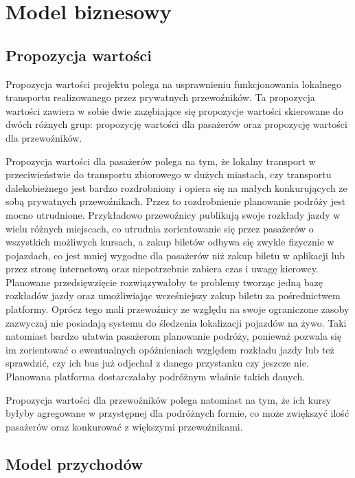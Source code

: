 \chapter{Model biznesowy}
\label{chap:drugi}



\section{Propozycja wartości}

Propozycja wartości projektu polega na usprawnieniu funkcjonowania lokalnego transportu realizowanego przez prywatnych przewoźników. Ta propozycja wartości zawiera w sobie dwie zazębiające się propozycje wartości skierowane do dwóch różnych grup: propozycję wartości dla pasażerów oraz propozycję wartości dla przewoźników.

Propozycja wartości dla pasażerów polega na tym, że lokalny transport w przeciwieństwie do transportu zbiorowego w dużych miastach, czy transportu dalekobieżnego jest bardzo rozdrobniony i opiera się na małych konkurujących ze sobą prywatnych przewoźnikach. Przez to rozdrobnienie planowanie podróży jest mocno utrudnione. Przykładowo przewoźnicy publikują swoje rozkłady jazdy w wielu różnych miejscach, co utrudnia zorientowanie się przez pasażerów o wszystkich możliwych kursach, a zakup biletów odbywa się zwykle fizycznie w pojazdach, co jest mniej wygodne dla pasażerów niż zakup biletu w aplikacji lub przez stronę internetową oraz niepotrzebnie zabiera czas i uwagę kierowcy. Planowane przedsięwzięcie rozwiązywałoby te problemy tworząc jedną bazę rozkładów jazdy oraz umożliwiając wcześniejszy zakup biletu za pośrednictwem platformy. Oprócz tego mali przewoźnicy ze względu na swoje ograniczone zasoby zazwyczaj nie posiadają systemu do śledzenia lokalizacji pojazdów na żywo. Taki natomiast bardzo ułatwia pasażerom planowanie podróży, ponieważ pozwala się im zorientować o ewentualnych opóźnieniach względem rozkładu jazdy lub też sprawdzić, czy ich bus już odjechał z danego przystanku czy jeszcze nie. Planowana platforma dostarczałaby podróżnym właśnie takich danych.

Propozycja wartości dla przewoźników polega natomiast na tym, że ich kursy byłyby agregowane w przystępnej dla podróżnych formie, co może zwiększyć ilość pasażerów oraz konkurować z większymi przewoźnikami. 

\section{Model przychodów}

